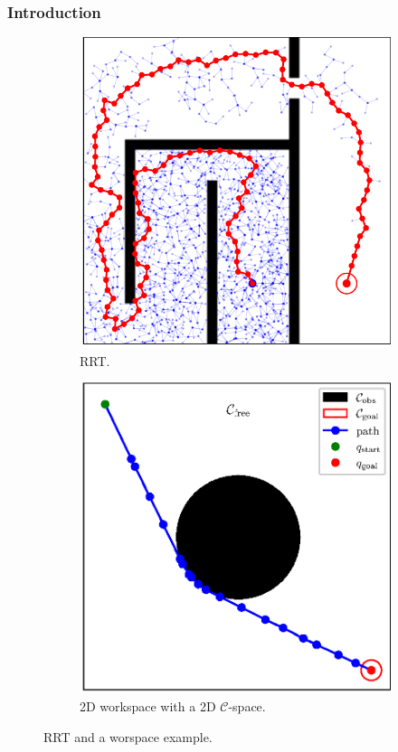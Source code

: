 \documentclass{beamer}
\begin{document}
\begin{frame}
	\frametitle{Introduction}	
	\begin{figure}[!ht]
		\centering  
		\begin{subfigure}[b]{0.45\textwidth}
			\includegraphics[width=\textwidth]{figChap3/RRT_maze7748i119w.pdf}
			\caption{RRT.} 
		\end{subfigure}
		\begin{subfigure}[b]{0.45\textwidth}
			\includegraphics[width=\linewidth]{figChap2/ConfigSpace.eps}
			\caption{2D workspace with a 2D $\mathcal{C}$-space.}
		\end{subfigure} 
		\caption{RRT and a worspace example.} 
	  \end{figure}
\end{frame}	
\end{document}
